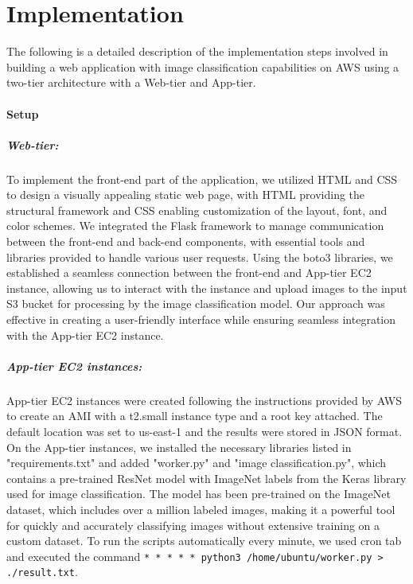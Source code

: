 \documentclass[../main.tex]{subfiles}
\begin{document}
\part*{Implementation}
The following is a detailed description of the implementation steps involved in building a web application with image classification capabilities on AWS using a two-tier architecture with a Web-tier and App-tier.
\subsection*{Setup}

\subsubsection*{Web-tier:}
To implement the front-end part of the application, we utilized HTML and CSS to design a visually appealing static web page, with HTML providing the structural framework and CSS enabling customization of the layout, font, and color schemes. We integrated the Flask framework to manage communication between the front-end and back-end components, with essential tools and libraries provided to handle various user requests. Using the boto3 libraries, we established a seamless connection between the front-end and App-tier EC2 instance, allowing us to interact with the instance and upload images to the input S3 bucket for processing by the image classification model. Our approach was effective in creating a user-friendly interface while ensuring seamless integration with the App-tier EC2 instance.

\subsubsection*{App-tier EC2 instances:}
App-tier EC2 instances were created following the instructions \citet{ec2} provided by AWS to create an AMI with a t2.small instance type and a root key attached. The default location was set to us-east-1 and the results were stored in JSON format. On the App-tier instances, we installed the necessary libraries listed in "requirements.txt" and added "worker.py" and "image classification.py", which contains a pre-trained ResNet model with ImageNet labels from the Keras library used for image classification. The model has been pre-trained on the ImageNet dataset, which includes over a million labeled images, making it a powerful tool for quickly and accurately classifying images without extensive training on a custom dataset. To run the scripts automatically every minute, we used cron tab and executed the command \texttt{* * * * * python3 /home/ubuntu/worker.py > ./result.txt}.
\end{document}
